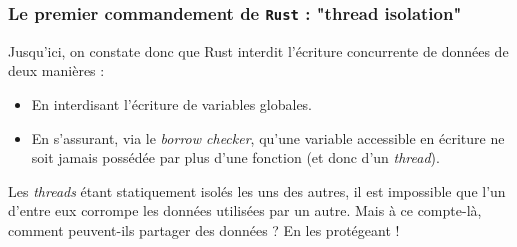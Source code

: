 \begin{frame}
  \frametitle{Le premier commandement de \texttt{Rust} : "thread isolation"}
Jusqu'ici, on constate donc que Rust interdit l'écriture concurrente de données de deux manières :
\begin{itemize}
\item En interdisant l'écriture de variables globales.
\item En s'assurant, via le \textit{borrow checker}, qu'une variable accessible en écriture ne soit jamais possédée par plus d'une fonction (et donc d'un \textit{thread}).
\end{itemize}

Les \textit{threads} étant statiquement isolés les uns des autres, il est impossible que l'un d'entre eux corrompe les données utilisées par un autre. Mais à ce compte-là, comment peuvent-ils partager des données ? En les protégeant !
\end{frame}

